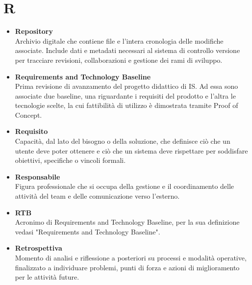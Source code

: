 \documentclass[a4paper,12pt]{article}
\begin{document}
        \section*{R} {
            \begin{itemize}
                \item \textbf{Repository}\\
                    Archivio digitale che contiene file e l'intera cronologia delle modifiche associate. Include dati e metadati necessari al sistema di controllo versione per tracciare revisioni, collaborazioni e gestione dei rami di sviluppo.
                \item \textbf{Requirements and Technology Baseline}\\
                    Prima revisione di avanzamento del progetto didattico di IS. Ad essa sono associate due baseline, una riguardante i requisiti del prodotto e l'altra le tecnologie scelte, la cui fattibilità di utilizzo è dimostrata tramite Proof of Concept.
                \item \textbf{Requisito}\\
                    Capacità, dal lato del bisogno o della soluzione, che definisce ciò che un utente deve poter ottenere e ciò che un sistema deve rispettare per soddisfare obiettivi, specifiche o vincoli formali.
                \item \textbf{Responsabile}\\
                    Figura professionale che si occupa della gestione e il coordinamento delle attività del team e delle comunicazione verso l'esterno.
                \item \textbf{RTB}\\
                    Acronimo di Requirements and Technology Baseline, per la sua definizione vedasi "Requirements and Technology Baseline".
                \item \textbf{Retrospettiva}\\
                    Momento di analisi e riflessione a posteriori su processi e modalità operative, finalizzato a individuare problemi, punti di forza e azioni di miglioramento per le attività future.
            \end{itemize}
        }
        \newpage
\end{document}
